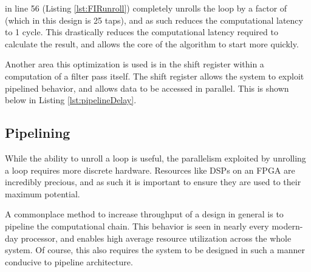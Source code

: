 \documentclass[../report_polarFIR.tex]{subfiles}
\begin{document}
\begin{quote}
\begin{singlespace}
    
\end{singlespace}
\end{quote}

 in line 56 (Listing \ref{lst:FIRunroll}) completely unrolls the loop by a factor of  (which in this design is 25 taps), and as such reduces the computational latency to 1 cycle. This drastically reduces the computational latency required to calculate the result, and allows the core of the algorithm to start more quickly.

Another area this optimization is used is in the shift register within a computation of a filter pass itself. The shift register allows the system to exploit pipelined behavior, and allows data to be accessed in parallel. This is shown below in Listing \ref{lst:pipelineDelay}.


\begin{quote}
\begin{singlespace}
    
\end{singlespace}
\end{quote}


\subsection{Pipelining}

While the ability to unroll a loop is useful, the parallelism exploited by unrolling a loop requires more discrete hardware. Resources like DSPs on an FPGA are incredibly precious, and as such it is important to ensure they are used to their maximum potential.

A commonplace method to increase throughput of a design in general is to pipeline the computational chain. This behavior is seen in nearly every modern-day processor, and enables high average resource utilization across the whole system. Of course, this also requires the system to be designed in such a manner conducive to pipeline architecture.
\end{document}
